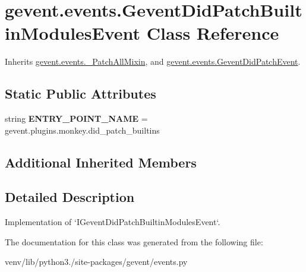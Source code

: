 \hypertarget{classgevent_1_1events_1_1_gevent_did_patch_builtin_modules_event}{}\section{gevent.\+events.\+Gevent\+Did\+Patch\+Builtin\+Modules\+Event Class Reference}
\label{classgevent_1_1events_1_1_gevent_did_patch_builtin_modules_event}


Inherits \hyperlink{classgevent_1_1events_1_1___patch_all_mixin}{gevent.\+events.\+\_\+\+Patch\+All\+Mixin}, and \hyperlink{classgevent_1_1events_1_1_gevent_did_patch_event}{gevent.\+events.\+Gevent\+Did\+Patch\+Event}.

\subsection*{Static Public Attributes}
\begin{DoxyCompactItemize}
\item 
\mbox{\label{classgevent_1_1events_1_1_gevent_did_patch_builtin_modules_event_a7bf35cc0f22211ab8d87eab03f717add}} 
string {\bfseries E\+N\+T\+R\+Y\+\_\+\+P\+O\+I\+N\+T\+\_\+\+N\+A\+ME} = \textquotesingle{}gevent.\+plugins.\+monkey.\+did\+\_\+patch\+\_\+builtins\textquotesingle{}
\end{DoxyCompactItemize}
\subsection*{Additional Inherited Members}


\subsection{Detailed Description}
\begin{DoxyVerb}Implementation of `IGeventDidPatchBuiltinModulesEvent`.
\end{DoxyVerb}
 

The documentation for this class was generated from the following file\+:\begin{DoxyCompactItemize}
\item 
venv/lib/python3./site-\/packages/gevent/events.\+py\end{DoxyCompactItemize}
